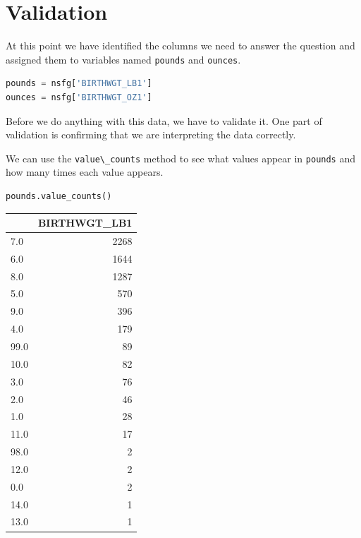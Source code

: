 \hypertarget{validation}{%
\section{Validation}\label{validation}}

At this point we have identified the columns we need to answer the
question and assigned them to variables named
\passthrough{\lstinline!pounds!} and \passthrough{\lstinline!ounces!}.

\begin{lstlisting}[language=Python,style=source]
pounds = nsfg['BIRTHWGT_LB1']
ounces = nsfg['BIRTHWGT_OZ1']
\end{lstlisting}

Before we do anything with this data, we have to validate it. One part
of validation is confirming that we are interpreting the data correctly.

We can use the \passthrough{\lstinline!value\_counts!} method to see
what values appear in \passthrough{\lstinline!pounds!} and how many
times each value appears.

\begin{lstlisting}[language=Python,style=source]
pounds.value_counts()
\end{lstlisting}

\begin{tabular}{lr}
\toprule
{} &  BIRTHWGT\_LB1 \\
\midrule
7.0  &          2268 \\
6.0  &          1644 \\
8.0  &          1287 \\
5.0  &           570 \\
9.0  &           396 \\
4.0  &           179 \\
99.0 &            89 \\
10.0 &            82 \\
3.0  &            76 \\
2.0  &            46 \\
1.0  &            28 \\
11.0 &            17 \\
98.0 &             2 \\
12.0 &             2 \\
0.0  &             2 \\
14.0 &             1 \\
13.0 &             1 \\
\bottomrule
\end{tabular}

